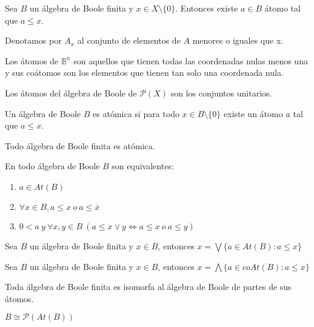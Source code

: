 \begin{lema}
    Sea $B$ un álgebra de Boole finita y $x \in X \setminus \{0\}$. Entonces existe $a \in B$ átomo tal que $a \leq x$.
\end{lema}
\begin{nota}
    Denotamos por $A_x$ al conjunto de elementos de $A$ menores o iguales que x.
\end{nota}

\begin{ejemplo}
    Los átomos de $\mathbb{B}^n$ son aquellos que tienen todas las coordenadas nulas menos una y sus coátomos son los elementos que tienen tan solo una coordenada nula.
\end{ejemplo}
\begin{ejemplo}
    Los átomos del álgebra de Boole de $\mathcal{P}(X)$ son los conjuntos unitarios.
\end{ejemplo}

\begin{ndef}
    Un álgebra de Boole $B$ es atómica si para todo $x \in B \setminus \{0\}$ existe un átomo $a$ tal que $a \leq x$.
\end{ndef}
\begin{nth}
    Todo álgebra de Boole finita es atómica.
\end{nth}
\begin{nth}
    En todo álgebra de Boole $B$ son equivalentes:
    \begin{enumerate}
        \item $a \in At(B)$
        \item $\forall x \in B, a \leq x \ o \ a \leq \overline{x}$
        \item $0 < a \ y \ \forall x,y \in B \ (a \leq x \lor y \Leftrightarrow a \leq x \ o \ a \leq y)$
    \end{enumerate}
\end{nth}
\begin{nth}
    Sea $B$ un álgebra de Boole finita  y $x \in B$, entonces $x = \bigvee \{a \in At(B): a \leq x\}$
\end{nth}
\begin{nth}
    Sea $B$ un álgebra de Boole finita  y $x \in B$, entonces $x = \bigwedge \{a \in coAt(B): a \leq x\}$
\end{nth}

\begin{ncor}
    Toda álgebra de Boole finita es isomorfa al álgebra de Boole de partes de sus átomos.
    \begin{center} $B \cong \mathcal{P} (At(B))$ \end{center}
\end{ncor}


